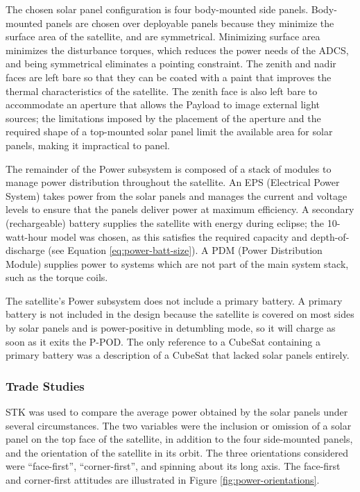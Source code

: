 \documentclass[12pt]{article}
\begin{document}
			The chosen solar panel configuration is four body-mounted side panels.  Body-mounted panels are chosen over deployable panels because they minimize the surface area of the satellite, and are symmetrical.  Minimizing surface area minimizes the disturbance torques, which reduces the power needs of the ADCS, and being symmetrical eliminates a pointing constraint.  The zenith and nadir faces are left bare so that they can be coated with a paint that improves the thermal characteristics of the satellite.  The zenith face is also left bare to accommodate an aperture that allows the Payload to image external light sources; the limitations imposed by the placement of the aperture and the required shape of a top-mounted solar panel limit the available area for solar panels, making it impractical to panel.

The remainder of the Power subsystem is composed of a stack of modules to manage power distribution throughout the satellite.  An EPS (Electrical Power System) takes power from the solar panels and manages the current and voltage levels to ensure that the panels deliver power at maximum efficiency.  A secondary (rechargeable) battery supplies the satellite with energy during eclipse; the 10-watt-hour model was chosen, as this satisfies the required capacity and depth-of-discharge (see Equation \ref{eq:power-batt-size}).  A PDM (Power Distribution Module) supplies power to systems which are not part of the main system stack, such as the torque coils.

The satellite's Power subsystem does not include a primary battery.  A primary battery is not included in the design because the satellite is covered on most sides by solar panels and is power-positive in detumbling mode, so it will charge as soon as it exits the P-POD.  The only reference to a CubeSat containing a primary battery was a description of a CubeSat that lacked solar panels entirely.\cite{libertad-1}

\subsubsection{Trade Studies}
			
			STK was used to compare the average power obtained by the solar panels under several circumstances.  The two variables were the inclusion or omission of a solar panel on the top face of the satellite, in addition to the four side-mounted panels, and the orientation of the satellite in its orbit.  The three orientations considered were ``face-first'', ``corner-first'', and spinning about its long axis.  The face-first and corner-first attitudes are illustrated in Figure \ref{fig:power-orientations}.
			
\end{document}
